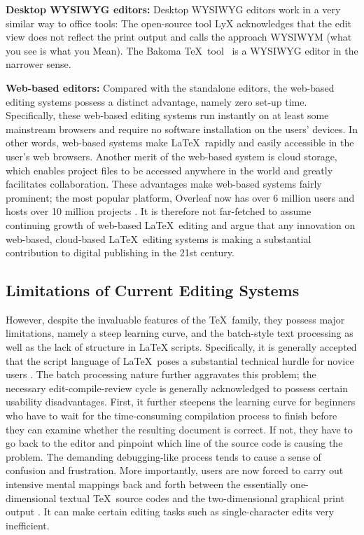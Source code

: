 \documentclass[sigconf]{acmart}
\begin{document}
\textbf{Desktop WYSIWYG editors:}
Desktop WYSIWYG editors work in a very similar way to office tools: The open-source tool LyX \cite{kastrup2002revisiting} acknowledges that the edit view does not reflect the print output and calls the approach WYSIWYM (what you see is what you Mean).
The Bakoma \TeX\ tool~\cite{soft2011bakoma} is a WYSIWYG editor in the narrower sense. 

\textbf{Web-based editors:}
Compared with the standalone editors, the web-based editing systems possess a distinct advantage, namely zero set-up time. 
Specifically, these web-based editing systems run instantly on at least some mainstream browsers and require no software installation on the users' devices. 
In other words, web-based systems make \LaTeX\ rapidly and easily accessible in the user's web browsers.
Another merit of the web-based system is cloud storage, which enables project files to be accessed anywhere in the world and greatly facilitates collaboration. 
These advantages make web-based systems fairly prominent; the most popular platform, Overleaf now  has over 6 million users and hosts over 10 million projects \cite{overleafstat}. 
It is therefore not far-fetched to assume continuing growth of web-based \LaTeX\ editing and argue that any innovation on web-based, cloud-based \LaTeX\ editing systems is making a substantial contribution to digital publishing in the 21st century.

\subsection{Limitations of Current Editing Systems}
However, despite the invaluable features of the \TeX\ family, they possess major limitations, namely a steep learning curve, and the batch-style text processing as well as the lack of structure in LaTeX scripts.
Specifically, it is generally accepted that the script language of \LaTeX\  poses a substantial technical hurdle for novice users \cite{gratzer2008gentle}. 
The batch processing nature  further aggravates this problem; the necessary edit-compile-review cycle  is generally acknowledged to possess certain usability disadvantages.
First, it further steepens the learning curve for  beginners who have to wait for the time-consuming compilation process to finish before they can examine whether the resulting document is correct. 
If not, they have to go back to the editor and pinpoint which line of the source code is causing the problem. 
The demanding debugging-like process tends to cause a sense of confusion and frustration. 
More importantly, users are now forced to carry out intensive mental mappings back and forth between the essentially one-dimensional textual \TeX\ source codes and the two-dimensional graphical print output \cite{brown2013integrated}. 
It can make certain editing tasks such as single-character edits very inefficient. 
\end{document}
